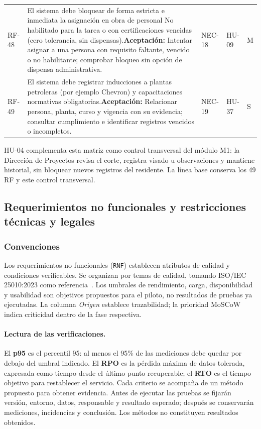 \documentclass[12pt,letterpaper]{article}
\begin{document}
{\begin{longtable}{@{}L{1.6cm}L{8.05cm}L{2.0cm}L{1.5cm}L{1.2cm}@{}}
RF-48 & El sistema debe bloquear de forma estricta e inmediata la asignación en obra de personal No habilitado para la tarea o con certificaciones vencidas (cero tolerancia, sin dispensas).\newline \textbf{Aceptación:} Intentar asignar a una persona con requisito faltante, vencido o no habilitante; comprobar bloqueo sin opción de dispensa administrativa. & NEC-18 & HU-09 & M\\
RF-49 & El sistema debe registrar inducciones a plantas petroleras (por ejemplo Chevron) y capacitaciones normativas obligatorias.\newline \textbf{Aceptación:} Relacionar persona, planta, curso y vigencia con su evidencia; consultar cumplimiento e identificar registros vencidos o incompletos. & NEC-19 & HU-37 & S\\
\end{longtable}
}

HU-04 complementa esta matriz como control transversal del módulo M1: la Dirección de Proyectos revisa el corte, registra visado u observaciones y mantiene historial, sin bloquear nuevos registros del residente. La línea base conserva los 49 RF y este control transversal.

\subsection{Requerimientos no funcionales y restricciones técnicas y legales}
\label{sec:rnf}

\subsubsection{Convenciones}

Los requerimientos no funcionales (\texttt{RNF}) establecen atributos de calidad y condiciones verificables. Se organizan por temas de calidad, tomando ISO/IEC 25010:2023 como referencia~\cite{iso25010}. Los umbrales de rendimiento, carga, disponibilidad y usabilidad son objetivos propuestos para el piloto, no resultados de pruebas ya ejecutadas. La columna \emph{Origen} establece trazabilidad; la prioridad MoSCoW indica criticidad dentro de la fase respectiva.


\paragraph{Lectura de las verificaciones.}
El \textbf{p95} es el percentil 95: al menos el 95\% de las mediciones debe quedar por debajo del umbral indicado. El \textbf{RPO} es la pérdida máxima de datos tolerada, expresada como tiempo desde el último punto recuperable; el \textbf{RTO} es el tiempo objetivo para restablecer el servicio. Cada criterio se acompaña de un método propuesto para obtener evidencia. Antes de ejecutar las pruebas se fijarán versión, entorno, datos, responsable y resultado esperado; después se conservarán mediciones, incidencias y conclusión. Los métodos no constituyen resultados obtenidos.
\end{document}
